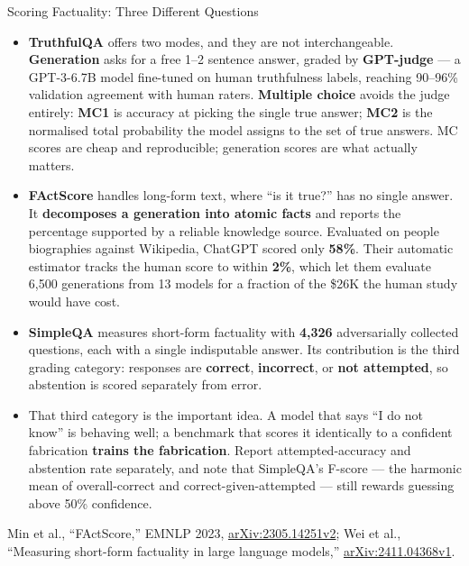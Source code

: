 \begin{frame}[allowframebreaks]{Scoring Factuality: Three Different Questions}
  \begin{itemize}\footnotesize\itemsep0.3em
    \item[\textcolor{red}{$\blacktriangleright$}] \textbf{TruthfulQA} offers two modes, and they are not interchangeable. \textbf{Generation} asks for a free 1--2 sentence answer, graded by \textbf{GPT-judge} --- a GPT-3-6.7B model fine-tuned on human truthfulness labels, reaching 90--96\% validation agreement with human raters. \textbf{Multiple choice} avoids the judge entirely: \textbf{MC1} is accuracy at picking the single true answer; \textbf{MC2} is the normalised total probability the model assigns to the set of true answers. MC scores are cheap and reproducible; generation scores are what actually matters.
    \item[\textcolor{red}{$\blacktriangleright$}] \textbf{FActScore} handles long-form text, where ``is it true?'' has no single answer. It \textbf{decomposes a generation into atomic facts} and reports the percentage supported by a reliable knowledge source. Evaluated on people biographies against Wikipedia, ChatGPT scored only \textbf{58\%}. Their automatic estimator tracks the human score to within \textbf{2\%}, which let them evaluate 6{,}500 generations from 13 models for a fraction of the \$26K the human study would have cost.
    \item[\textcolor{red}{$\blacktriangleright$}] \textbf{SimpleQA} measures short-form factuality with \textbf{4{,}326} adversarially collected questions, each with a single indisputable answer. Its contribution is the third grading category: responses are \textbf{correct}, \textbf{incorrect}, or \textbf{not attempted}, so abstention is scored separately from error.
    \item[\textcolor{red}{$\blacktriangleright$}] That third category is the important idea. A model that says ``I do not know'' is behaving well; a benchmark that scores it identically to a confident fabrication \textbf{trains the fabrication}. Report attempted-accuracy and abstention rate separately, and note that SimpleQA's F-score --- the harmonic mean of overall-correct and correct-given-attempted --- still rewards guessing above 50\% confidence.
  \end{itemize}
  \vspace{0.1em}
  {\scriptsize Min et al., ``FActScore,'' EMNLP 2023, \href{https://arxiv.org/abs/2305.14251v2}{arXiv:2305.14251v2}; Wei et al., ``Measuring short-form factuality in large language models,'' \href{https://arxiv.org/abs/2411.04368v1}{arXiv:2411.04368v1}.}
\end{frame}

